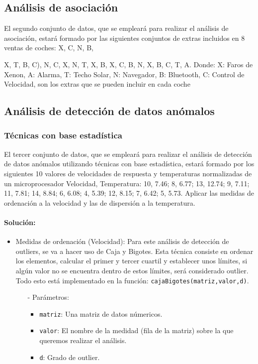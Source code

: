 \documentclass[a4paper, 12pt]{article}
\begin{document}
	\subsection{Análisis de asociación}
	El segundo conjunto de datos, que se empleará para realizar el análisis de asociación, estará formado por las siguientes conjuntos de extras incluidos en 8 ventas de coches: {X, C, N, B}, {X, T, B, C), {N, C, X}, {N, T, X, B}, {X, C, B}, {N}, {X, B, C}, {T, A}. Donde: {X: Faros de Xenon, A: Alarma, T: Techo Solar, N: Navegador, B: Bluetooth, C: Control de Velocidad}, son los extras que se pueden incluir en cada coche
		
		\subsection{Análisis de detección de datos anómalos}
		
		\subsubsection{Técnicas con base estadística}
		El tercer conjunto de datos, que se empleará para realizar el análisis de detección de datos anómalos utilizando técnicas con base estadística, estará formado por los siguientes 10 valores de velocidades de respuesta y temperaturas normalizadas de un microprocesador {Velocidad, Temperatura}: {10, 7.46; 8, 6.77; 13, 12.74; 9, 7.11; 11, 7.81; 14, 8.84; 6, 6.08; 4, 5.39; 12, 8.15; 7, 6.42; 5, 5.73}. Aplicar las medidas de ordenación a la velocidad y las de dispersión a la temperatura.
		
		\paragraph{Solución:}
		\begin{itemize}
			\item Medidas de ordenación (Velocidad): Para este análisis de detección de outliers, se va a hacer uso de Caja y Bigotes. Esta técnica consiste en ordenar los elementos, calcular el primer y tercer cuartil y establecer unos límites, si algún valor no se encuentra dentro de estos límites, será considerado outlier. \\ Todo esto está implementado en la función: \texttt{cajaBigotes(matriz,valor,d)}.
			\begin{itemize}
				\item[-] Parámetros:
				\begin{itemize}
					\item \texttt{matriz}: Una matriz de datos númericos.
					\item \texttt{valor}: El nombre de la medidad (fila de la matriz) sobre la que queremos realizar el análisis.
					\item \texttt{d}: Grado de outlier.
				\end{itemize}
				

\end{itemize}
\end{itemize}}
\end{document}
